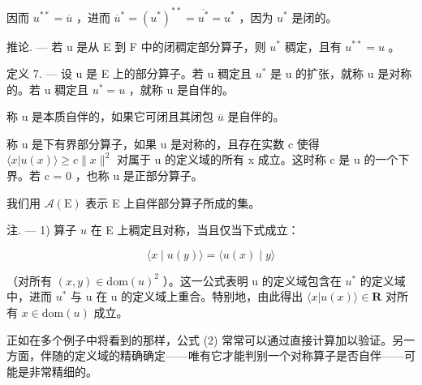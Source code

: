 因而 \(u^{**} = \overline{u}\) ，进而 \(\overline{u}^{*} = (u^{*})^{**} = \overline{u^{*}} = u^{*}\) ，因为 \(u^{*}\) 是闭的。

推论. --- 若 u 是从 E 到 F 中的闭稠定部分算子，则 \(u^{*}\) 稠定，且有 \(u^{**} = u\) 。

定义 7. --- 设 u 是 E 上的部分算子。若 u 稠定且 \(u^{*}\) 是 u 的扩张，就称 u 是对称的。若 u 稠定且 \(u^{*} = u\) ，就称 u 是自伴的。

称 u 是本质自伴的，如果它可闭且其闭包 \(\overline{u}\) 是自伴的。

称 u 是下有界部分算子，如果 u 是对称的，且存在实数 c 使得 \(\langle x | u(x) \rangle \geqslant c \|x\|^{2}\) 对属于 u 的定义域的所有 x 成立。这时称 c 是 u 的一个下界。若 c = 0 ，也称 u 是正部分算子。

我们用 \(\mathcal{A}(\mathrm{E})\) 表示 E 上自伴部分算子所成的集。

注. --- 1) 算子 \(u\) 在 E 上稠定且对称，当且仅当下式成立：

\[
\langle x \mid u (y) \rangle = \langle u (x) \mid y \rangle\tag{2}
\]

（对所有 \((x,y)\in\mathrm{dom}(u)^{2}\) ）。这一公式表明 u 的定义域包含在 \(u^{*}\) 的定义域中，进而 \(u^{*}\) 与 u 在 u 的定义域上重合。特别地，由此得出 \(\langle x|u(x)\rangle\in\mathbf{R}\) 对所有 \(x\in\mathrm{dom}(u)\) 成立。

正如在多个例子中将看到的那样，公式 (2) 常常可以通过直接计算加以验证。另一方面，伴随的定义域的精确确定——唯有它才能判别一个对称算子是否自伴——可能是非常精细的。

